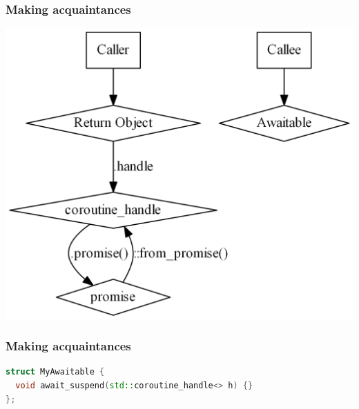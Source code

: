 \documentclass[aspectratio=169]{beamer}
\begin{document}
\begin{frame}[fragile]
  \frametitle{Making acquaintances}
  
  \begin{center}
  \includegraphics[height=.9\textheight]{pipelinesgfx/acquaintances02.png}
  \end{center}
\end{frame}


\begin{frame}[fragile]
  \frametitle{Making acquaintances}

  \begin{lstlisting}[language={C++}]
struct MyAwaitable {
  void await_suspend(std::coroutine_handle<> h) {}
};
  \end{lstlisting}
\end{frame}
\end{document}
